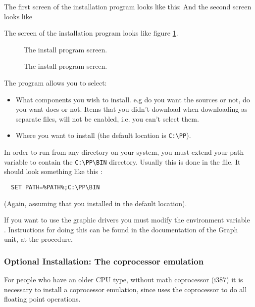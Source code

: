 \documentclass{book}
\begin{document}
\begin{htmlonly}
The first screen of the installation program looks like this:
And the second screen looks like
\end{htmlonly}
\begin{latexonly}
The screen of the installation program looks like figure \ref{fig:install}.
\begin{figure}
\caption{The \dos install program screen.}
\label{fig:install}
\ifpdf
{}
\end{figure}
\begin{figure}
\caption{The \dos install program screen.}
\label{fig:installb}
\else
{}
\fi
\end{figure}
\end{latexonly}

The program allows you to select:
\begin{itemize}
\item What components you wish to install. e.g do you want the sources or
not, do you want docs or not. Items that you didn't download when
downloading as separate files, will not be enabled, i.e. you can't
select them.

\item Where you want to install (the default location is \verb|C:\PP|).
\end{itemize}

In order to run \fpc from any directory on your system, you must extend
your path variable to contain the \verb|C:\PP\BIN| directory.
Usually this is done in the  file.
It should look something like this :
\begin{verbatim}
  SET PATH=%PATH%;C:\PP\BIN
\end{verbatim}
(Again, assuming that you installed in the default location).

If you want to use the graphic drivers you must modify the
environment variable . Instructions for doing this can be found
in the documentation of the Graph unit, at the  procedure.

\subsubsection{Optional Installation: The coprocessor emulation}
For people who have an older CPU type, without math coprocessor (i387)
it is necessary to install a coprocessor emulation, since \fpc uses the
coprocessor to do all floating point operations.
\end{document}
